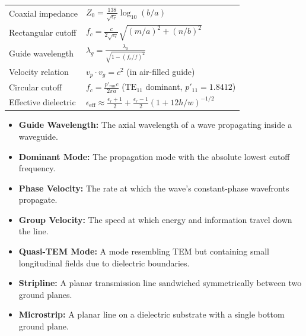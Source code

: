 \documentclass[12pt,a4paper]{article}
\renewcommand{\arraystretch}{1.45}
\begin{document}
\begin{tcolorbox}[formulabox, title={\textbf{Key Formulas at a Glance}}]
\renewcommand{\arraystretch}{1.3}
\begin{tabularx}{\linewidth}{B{4.5cm} X}Coaxial impedance       & $Z_0 = \frac{138}{\sqrt{\epsilon_r}} \log_{10}(b/a)$ \\[4pt]
Rectangular cutoff      & $f_c = \frac{c}{2\sqrt{\epsilon_r}} \sqrt{(m/a)^2 + (n/b)^2}$ \\[4pt]
Guide wavelength        & $\lambda_g = \frac{\lambda_0}{\sqrt{1 - (f_c/f)^2}}$ \\[4pt]
Velocity relation       & $v_p \cdot v_g = c^2$ \quad (in air-filled guide) \\[4pt]
Circular cutoff         & $f_c = \frac{p'_{mn} c}{2\pi a}$ \quad ($\text{TE}_{11}$ dominant, $p'_{11}=1.8412$) \\[4pt]
Effective dielectric    & $\epsilon_{\text{eff}} \approx \frac{\epsilon_r + 1}{2} + \frac{\epsilon_r - 1}{2}(1 + 12h/w)^{-1/2}$
\end{tabularx}
\end{tcolorbox}

\begin{tcolorbox}[defbox, title={\textbf{One-Line Definitions}}]
\begin{itemize}[leftmargin=*, itemsep=2.5pt, topsep=0pt]
  \item \textbf{Guide Wavelength:} The axial wavelength of a wave propagating inside a waveguide.
  \item \textbf{Dominant Mode:} The propagation mode with the absolute lowest cutoff frequency.
  \item \textbf{Phase Velocity:} The rate at which the wave's constant-phase wavefronts propagate.
  \item \textbf{Group Velocity:} The speed at which energy and information travel down the line.
  \item \textbf{Quasi-TEM Mode:} A mode resembling TEM but containing small longitudinal fields due to dielectric boundaries.
  \item \textbf{Stripline:} A planar transmission line sandwiched symmetrically between two ground planes.
  \item \textbf{Microstrip:} A planar line on a dielectric substrate with a single bottom ground plane.
\end{itemize}
\end{tcolorbox}
\end{document}
